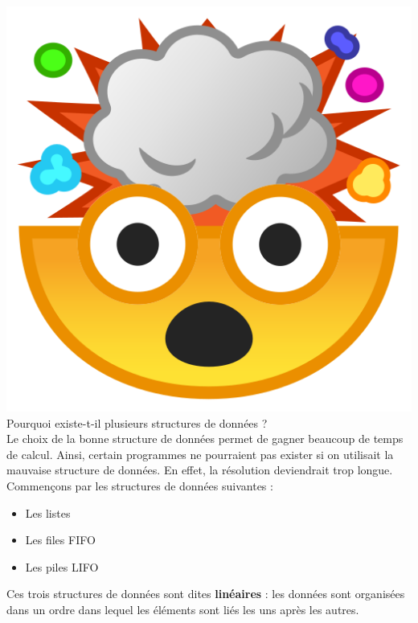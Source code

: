 \includegraphics[scale=0.03]{Thème 1 – Structures de données/Chapitre 1 - Interface et implémentation/BLOB/mindblow.png}{\selectfont
Pourquoi existe-t-il plusieurs structures de données ?\\
}
Le choix de la bonne structure de données permet de gagner beaucoup de temps de calcul. Ainsi, certain programmes ne pourraient pas exister si on utilisait la mauvaise structure de données. En effet, la résolution deviendrait trop longue.\\



Commençons par les structures de données suivantes :
\begin{itemize}
    \item Les listes
    \item Les files FIFO
    \item Les piles LIFO
\end{itemize}

\begin{tcolorbox}[enhanced,
    colback=green!25!black!10!white,colframe=green!75!black,title=Structuress linéaires,
    drop fuzzy shadow,watermark color=white]
Ces trois structures de données sont dites \textbf{linéaires} : les données sont organisées dans un ordre dans lequel les éléments sont liés les uns après les autres.
\end{tcolorbox}

